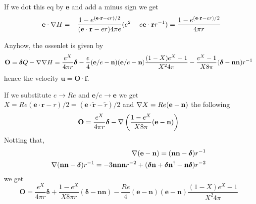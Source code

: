If we dot this eq by $\textbf{e}$ and add a minus sign we get
\begin{equation}
     - \textbf{e}\cdot \mathbf{\nabla} H
    = -\frac{1 - e^{(\textbf{e}\cdot \textbf{r} -e r)/2}}{(\textbf{e}\cdot \textbf{r} -e r) 4 \pi e} (e^2 - e \textbf{e}\cdot \textbf{r}r^{-1})
    = \frac{1 - e^{(\textbf{e}\cdot \textbf{r} -e r)/2}}{4 \pi r}
\end{equation}


Anyhow, the ossenlet is given by
\begin{equation}
    \textbf{O} = \bm\delta Q - \mathbf{\nabla}\mathbf{\nabla} H
    =
    \frac{e^X}{4\pi r}\bm\delta
    -
    \frac{e}{4}(\textbf{e}/e - \textbf{n})
    (\textbf{e}/e - \textbf{n})
    \frac{(1-X) e^X - 1}{X^2 4 \pi}
    - \frac{e^X- 1}{X 8 \pi }  (\bm\delta  - \textbf{nn} )r^{-1}
\end{equation}
hence the velocity $\textbf{u}=\textbf{O}\cdot \textbf{f}$.


If we substitute $e \to Re$ and $\textbf{e}/e \to \textbf{e}$ we get $X = Re(\textbf{e}\cdot \textbf{r} - r)/2 = (\textbf{e}\cdot \widetilde{\textbf{r} }- \widetilde{r})/2  $ and $\mathbf{\nabla} X = Re (\textbf{e} - \textbf{n})$ the following
\begin{align}
    \textbf{O}
    &=
    \frac{e^X}{4\pi r}\bm\delta
    -\mathbf{\nabla} \left(\frac{1-e^X}{X8\pi}(\textbf{e}- \textbf{n})\right)\\
\end{align}
Notting that,
\begin{align}
    \mathbf{\nabla} (\textbf{e}- \textbf{n}) = (\textbf{nn} - \bm\delta ) r^{-1}\\
    \mathbf{\nabla} (\textbf{nn} - \bm\delta ) r^{-1} = - 3 \textbf{nnn} r^{-2} + (\bm\delta \textbf{n}+ \bm\delta \textbf{n}^\dagger + \textbf{n}\bm\delta) r^{-2}
\end{align}
we get
\begin{equation}
    \textbf{O} =
    \frac{e^X}{4\pi r}\bm\delta
    + \frac{1 - e^X}{X 8 \pi r}  (\bm\delta  - \textbf{nn} )
    -
    \frac{Re}{4}(\textbf{e} - \textbf{n})
    (\textbf{e} - \textbf{n})
    \frac{(1-X) e^X - 1}{X^2 4 \pi}
\end{equation}

